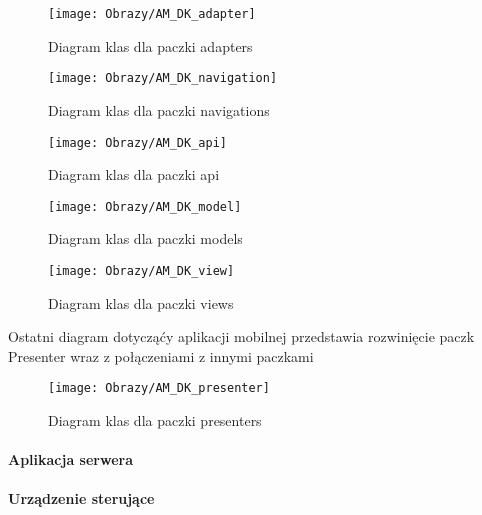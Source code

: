 		\begin{figure}[ht!]
		\centering
		\texttt{[image: Obrazy/AM\_DK\_adapter]}
		\caption{Diagram klas dla paczki adapters}
		\label{Diagram klas dla paczki adapters}
	\end{figure}
	

	
		\begin{figure}[ht!]
		\centering
		\texttt{[image: Obrazy/AM\_DK\_navigation]}
		\caption{Diagram klas dla paczki navigations}
		\label{Diagram klas dla paczki navigations}
	\end{figure}

	
	
	
	
	\begin{figure}[ht!]
		\centering
		\texttt{[image: Obrazy/AM\_DK\_api]}
		\caption{Diagram klas dla paczki api}
		\label{Diagram klas dla paczki api}
	\end{figure}

	

	\begin{figure}[ht!]
		\centering
		\texttt{[image: Obrazy/AM\_DK\_model]}
		\caption{Diagram klas dla paczki models}
		\label{Diagram klas dla paczki models}
	\end{figure}

	
\begin{figure}[ht!]
	\centering
	\texttt{[image: Obrazy/AM\_DK\_view]}
	\caption{Diagram klas dla paczki views}
	\label{Diagram klas dla paczki views}
\end{figure}

		
			Ostatni diagram dotycząćy aplikacji mobilnej przedstawia rozwinięcie paczk Presenter wraz z połączeniami z innymi paczkami
		\begin{figure}[!h]
			\centering
			\texttt{[image: Obrazy/AM\_DK\_presenter]}
			\caption{Diagram klas dla paczki presenters}
			\label{Diagram klas dla paczki presenters}
		\end{figure}
		
		\newpage
		\paragraph{Aplikacja serwera}
		\paragraph{Urządzenie sterujące}
